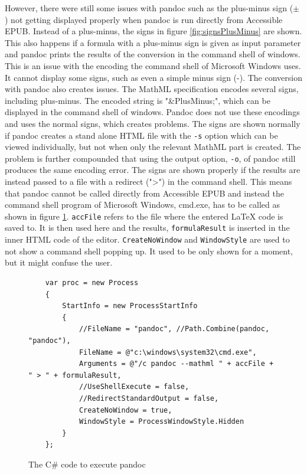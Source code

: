 However, there were still some issues with pandoc such as the plus-minus sign ($\pm$) not getting displayed properly when pandoc is run directly from Accessible EPUB. Instead of a plus-minus, the signs 
in figure \ref{fig:signsPlusMinus} are shown. This also happens if a formula with a plus-minus sign is given as input parameter and pandoc prints the results of the conversion in the command shell of windows. This is an issue with the encoding the command shell of Microsoft Windows uses. It cannot display some signs, such as even a simple minus sign (-). The conversion with pandoc also creates issues. The MathML specification \cite{mathMLrec} encodes several signs, including plus-minus. The encoded string is "\&PlusMinus;", which can be displayed in the command shell of windows. Pandoc does not use these encodings and uses the normal signs, which creates problems. The signs are shown normally if pandoc creates a stand alone HTML file with the \lstinline|-s| option which can be viewed individually, but not when only the relevant MathML part is created. The problem is further compounded that using the output option, \lstinline|-o|, of pandoc still produces the same encoding error. The signs are shown properly if the results are instead passed to a file with a redirect (">") in the command shell. This means that pandoc cannot be called directly from Accessible EPUB and instead the command shell program of Microsoft Windows, cmd.exe, has to be called as shown in figure \ref{fig:execPandoc}. \lstinline|accFile| refers to the file where the entered LaTeX code is saved to. It is then used here and the results, \lstinline|formulaResult| is inserted in the inner HTML code of the editor. \lstinline|CreateNoWindow| and \lstinline|WindowStyle| are used to not show a command shell popping up. It used to be only shown for a moment, but it might confuse the user.

\begin{figure}[h]
	
	\begin{lstlisting}
	var proc = new Process
	{
		StartInfo = new ProcessStartInfo
		{
			//FileName = "pandoc", //Path.Combine(pandoc, "pandoc"),
			FileName = @"c:\windows\system32\cmd.exe",
			Arguments = @"/c pandoc --mathml " + accFile + " > " + formulaResult,
			//UseShellExecute = false,
			//RedirectStandardOutput = false,
			CreateNoWindow = true,
			WindowStyle = ProcessWindowStyle.Hidden
		}
	}; 
	\end{lstlisting}
	\caption{The C\# code to execute pandoc}
	\label{fig:execPandoc}
\end{figure}

